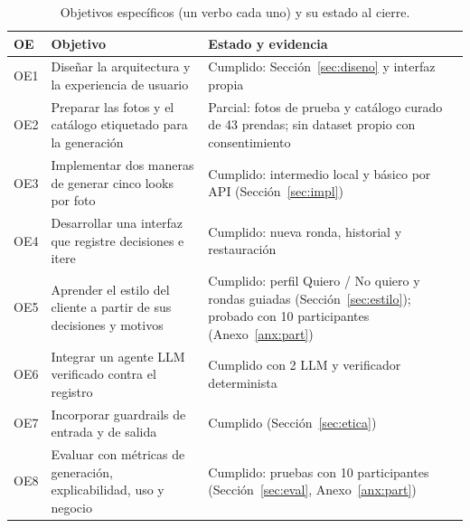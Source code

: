 \documentclass[11pt,letterpaper]{article}
\begin{document}
\begin{table}[H]
\centering
\caption{Objetivos específicos (un verbo cada uno) y su estado al cierre.}
\label{tab:oe}
\small
\begin{tabularx}{\textwidth}{@{}p{0.9cm}p{5.6cm}L@{}}
\toprule
\textbf{OE} & \textbf{Objetivo} & \textbf{Estado y evidencia} \\
\midrule
OE1 & Diseñar la arquitectura y la experiencia de usuario & Cumplido: Sección~\ref{sec:diseno} y interfaz propia \\
OE2 & Preparar las fotos y el catálogo etiquetado para la generación & Parcial: fotos de prueba y catálogo curado de 43 prendas; sin dataset propio con consentimiento \\
OE3 & Implementar dos maneras de generar cinco looks por foto & Cumplido: intermedio local y básico por API (Sección~\ref{sec:impl}) \\
OE4 & Desarrollar una interfaz que registre decisiones e itere & Cumplido: nueva ronda, historial y restauración \\
OE5 & Aprender el estilo del cliente a partir de sus decisiones y motivos & Cumplido: perfil Quiero / No quiero y rondas guiadas (Sección~\ref{sec:estilo}); probado con 10 participantes (Anexo~\ref{anx:part}) \\
OE6 & Integrar un agente LLM verificado contra el registro & Cumplido con 2 LLM y verificador determinista \\
OE7 & Incorporar guardrails de entrada y de salida & Cumplido (Sección~\ref{sec:etica}) \\
OE8 & Evaluar con métricas de generación, explicabilidad, uso y negocio & Cumplido: pruebas con 10 participantes (Sección~\ref{sec:eval}, Anexo~\ref{anx:part}) \\
\bottomrule
\end{tabularx}
\end{table}
\end{document}

